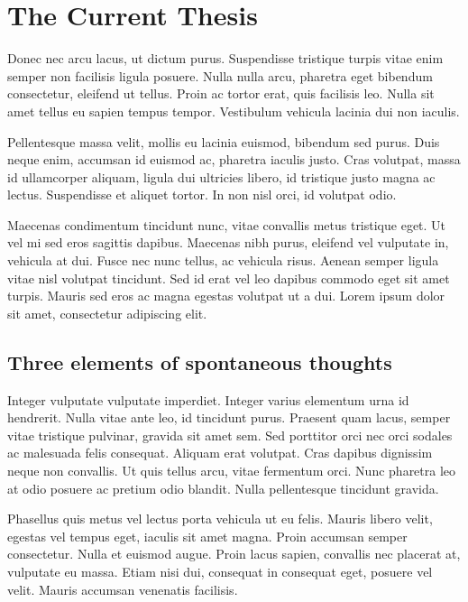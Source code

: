 \chapter{The Current Thesis}
\label{ch:cur}

\newpage

Donec nec arcu lacus, ut dictum purus. Suspendisse tristique turpis vitae enim semper non facilisis ligula posuere. Nulla nulla arcu, pharetra eget bibendum consectetur, eleifend ut tellus. Proin ac tortor erat, quis facilisis leo. Nulla sit amet tellus eu sapien tempus tempor. Vestibulum vehicula lacinia dui non iaculis. 

Pellentesque massa velit, mollis eu lacinia euismod, bibendum sed purus. Duis neque enim, accumsan id euismod ac, pharetra iaculis justo. Cras volutpat, massa id ullamcorper aliquam, ligula dui ultricies libero, id tristique justo magna ac lectus. Suspendisse et aliquet tortor. In non nisl orci, id volutpat odio. 

Maecenas condimentum tincidunt nunc, vitae convallis metus tristique eget. Ut vel mi sed eros sagittis dapibus. Maecenas nibh purus, eleifend vel vulputate in, vehicula at dui. Fusce nec nunc tellus, ac vehicula risus. Aenean semper ligula vitae nisl volutpat tincidunt. Sed id erat vel leo dapibus commodo eget sit amet turpis. Mauris sed eros ac magna egestas volutpat ut a dui. Lorem ipsum dolor sit amet, consectetur adipiscing elit.


\section{Three elements of spontaneous thoughts}
Integer vulputate vulputate imperdiet. Integer varius elementum urna id hendrerit. Nulla vitae ante leo, id tincidunt purus. Praesent quam lacus, semper vitae tristique pulvinar, gravida sit amet sem. Sed porttitor orci nec orci sodales ac malesuada felis consequat. Aliquam erat volutpat. Cras dapibus dignissim neque non convallis. Ut quis tellus arcu, vitae fermentum orci. Nunc pharetra leo at odio posuere ac pretium odio blandit. Nulla pellentesque tincidunt gravida. 

Phasellus quis metus vel lectus porta vehicula ut eu felis. Mauris libero velit, egestas vel tempus eget, iaculis sit amet magna. Proin accumsan semper consectetur. Nulla et euismod augue. Proin lacus sapien, convallis nec placerat at, vulputate eu massa. Etiam nisi dui, consequat in consequat eget, posuere vel velit. Mauris accumsan venenatis facilisis.

